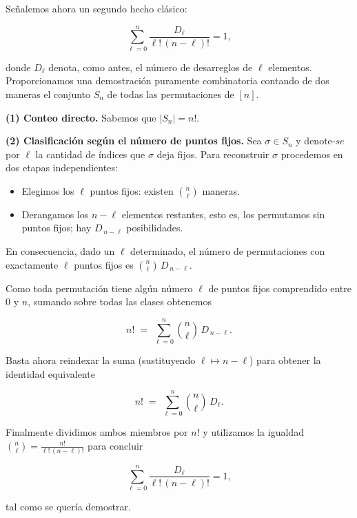 \begin{solucion}

\bigskip
Señalemos ahora un segundo hecho clásico:

\[
\sum_{\ell=0}^{n}\frac{D_\ell}{\ell!\,(n-\ell)!}=1,
\]

donde $D_\ell$ denota, como antes, el número de desarreglos de $\ell$ elementos.  
Proporcionamos una demostración puramente combinatoria contando de dos maneras el
conjunto $S_n$ de todas las permutaciones de $[n]$.

\textbf{(1) Conteo directo.}  
Sabemos que $\vert S_n\vert=n!$.

\textbf{(2) Clasificación según el número de puntos fijos.}  
Sea $\sigma\in S_n$ y denote‐\!$se$ por $\ell$ la cantidad de índices que
$\sigma$ deja fijos.  
Para reconstruir $\sigma$ procedemos en dos etapas independientes:

\begin{itemize}
  \item Elegimos los $\ell$ puntos fijos: existen $\binom{n}{\ell}$ maneras.
  \item Derangamos los $n-\ell$ elementos restantes, esto es, los
        permutamos sin puntos fijos; hay $D_{\,n-\ell}$ posibilidades.
\end{itemize}

En consecuencia, dado un $\ell$ determinado, el número de permutaciones con
exactamente $\ell$ puntos fijos es  
$\binom{n}{\ell}\,D_{\,n-\ell}$.

\medskip
Como toda permutación tiene algún número $\ell$ de puntos fijos comprendido entre
$0$ y $n$, sumando sobre todas las clases obtenemos

\[
n!\;=\;\sum_{\ell=0}^{n}\binom{n}{\ell}\,D_{\,n-\ell}.
\]

Basta ahora reindexar la suma (sustituyendo $\ell\mapsto n-\ell$) para
obtener la identidad equivalente

\[
n!\;=\;\sum_{\ell=0}^{n}\binom{n}{\ell}\,D_\ell.
\]

Finalmente dividimos ambos miembros por $n!$ y utilizamos la igualdad
$\displaystyle\binom{n}{\ell}=\frac{n!}{\ell!\,(n-\ell)!}$ para concluir

\[
\sum_{\ell=0}^{n}\frac{D_\ell}{\ell!\,(n-\ell)!}=1,
\]

tal como se quería demostrar.
\end{solucion}